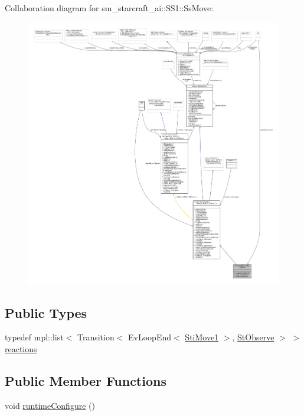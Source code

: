 Collaboration diagram for sm\+\_\+starcraft\+\_\+ai\+:\+:S\+S1\+:\+:Ss\+Move\+:
\nopagebreak
\begin{figure}[H]
\begin{center}
\leavevmode
\includegraphics[width=350pt]{structsm__starcraft__ai_1_1SS1_1_1SsMove__coll__graph}
\end{center}
\end{figure}
\subsection*{Public Types}
\begin{DoxyCompactItemize}
\item 
typedef mpl\+::list$<$ Transition$<$ Ev\+Loop\+End$<$ \hyperlink{structsm__starcraft__ai_1_1move__inner__states_1_1StiMove1}{Sti\+Move1} $>$, \hyperlink{structsm__starcraft__ai_1_1StObserve}{St\+Observe} $>$ $>$ \hyperlink{structsm__starcraft__ai_1_1SS1_1_1SsMove_a90e75f26213c0f79449f41de81d74836}{reactions}
\end{DoxyCompactItemize}
\subsection*{Public Member Functions}
\begin{DoxyCompactItemize}
\item 
void \hyperlink{structsm__starcraft__ai_1_1SS1_1_1SsMove_a46df0dc05c319abf90c83239716032c0}{runtime\+Configure} ()
\end{DoxyCompactItemize}
